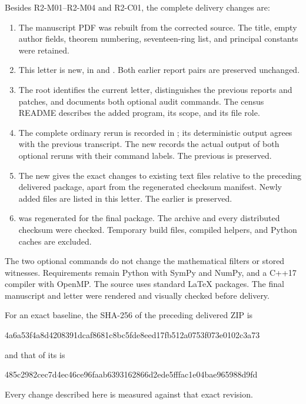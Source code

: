 \documentclass[11pt,a4paper]{article}
\begin{document}
Besides R2-M01--R2-M04 and R2-C01, the complete delivery changes are:
\begin{enumerate}
\item The manuscript PDF was rebuilt from the corrected source. The
title, empty author fields, theorem numbering, seventeen-ring list,
and principal constants were retained.
\item This letter is new, in
 and
. Both earlier report pairs are
preserved unchanged.
\item The root  identifies the current letter,
distinguishes the previous reports and patches, and documents both
optional audit commands. The census README describes the added
program, its scope, and its file role.
\item The complete ordinary rerun is recorded in
; its deterministic output agrees with the
previous transcript. The new
 records the actual output
of both optional reruns with their command labels. The previous
 is preserved.
\item The new  gives the exact changes
to existing text files relative to the preceding delivered package,
apart from the regenerated checksum manifest. Newly added files are
listed in this letter. The earlier  is preserved.
\item {} was regenerated for the final package.
The archive and every distributed checksum were checked. Temporary
build files, compiled helpers, and Python caches are excluded.
\end{enumerate}

The two optional commands do not change the mathematical filters or
stored witnesses. Requirements remain Python with SymPy and NumPy,
and a C++17 compiler with OpenMP. The source uses standard LaTeX
packages. The final manuscript and letter were rendered and visually
checked before delivery.

For an exact baseline, the SHA-256 of the preceding delivered ZIP is
\begin{center}\scriptsize\ttfamily
4a6a53f4a8d4208391dcaf8681c8bc5fde8eed17fb512a0753f073e0102c3a73
\end{center}
and that of its  is
\begin{center}\scriptsize\ttfamily
485c2982cec7d4ec46ce96faab6393162866d2ede5fffac1e04bae965988d9fd
\end{center}
Every change described here is measured against that exact revision.
\end{document}
